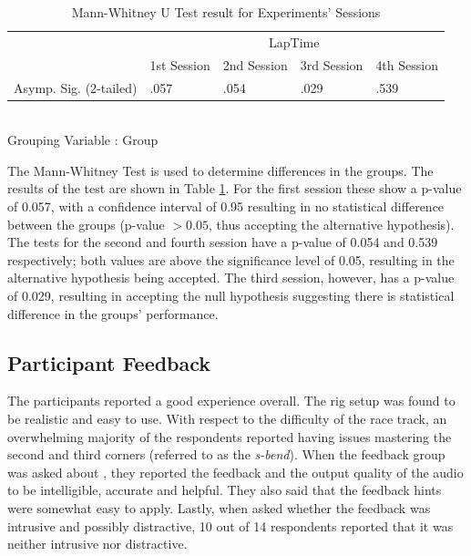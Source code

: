 \documentclass{sig-alternate}
\begin{document}
{\begin{table}
	\centering
	\begin{tabular}{|l|l|l|l|l|}
		\hline
		& \multicolumn{4}{c|}{LapTime}            \\ \cline{2-5} 
		& 1st Session & 2nd Session & 3rd Session & 4th Session \\ \hline
		Asymp. Sig. (2-tailed) & .057 & .054        & .029        & .539        \\ \hline
	\end{tabular}\\
	Grouping Variable : Group
	\caption[Mann-Whitney U Test for Experiments' Sessions]{Mann-Whitney U Test result for Experiments' Sessions}
	\label{table:Mann-Whitney-Sessions}
\end{table}

The Mann-Whitney Test is used to determine differences in the groups. The results of the test are shown in Table \ref{table:Mann-Whitney-Sessions}. For the first session these show a p-value of 0.057, with a confidence interval of 0.95 resulting in no statistical difference between the groups (p-value $> 0.05$, thus accepting the alternative hypothesis).  The tests for the second and fourth session have a p-value of 0.054 and 0.539 respectively; both values are above the significance level of 0.05, resulting in the alternative hypothesis being accepted. The third session, however, has a p-value of 0.029, resulting in accepting the null hypothesis suggesting there is statistical difference in the groups' performance.

\subsection{Participant Feedback}
The participants reported a good experience overall. The rig setup was found to be realistic and easy to use. With respect to the difficulty of the race track, an overwhelming majority of the respondents reported having issues mastering the second and third corners (referred to as the \emph{s-bend}). When the feedback group was asked about \methodname, they reported the feedback and the output quality of the audio to be intelligible, accurate and helpful. They also said that the feedback hints were somewhat easy to apply. Lastly, when asked whether the feedback was intrusive and possibly distractive, 10 out of 14 respondents reported that it was neither intrusive nor distractive.

}
\end{document}
